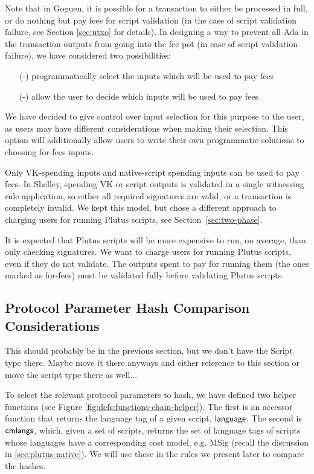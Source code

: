 Note that in Goguen, it is possible for a transaction
to either be processed in full, or do nothing but pay fees for script
validation (in the case of script validation failure, see Section
\ref{sec:utxo} for details).
In designing a way to prevent all Ada in the transaction outputs from going into
the fee pot (in case of script validation failure), we have considered two
possibilities:

\begin{itemize}
  \item[(-)] programmatically select the inputs which will be used to pay fees
  \item[(-)] allow the user to decide which inputs will be used to pay fees
\end{itemize}

We have decided to give control over input selection for this purpose to the user,
as users may have different considerations when making their selection. This
option will additionally allow users to write their own programmatic solutions
to choosing for-fees inputs.

Only VK-spending inputs and native-script spending inputs can
be used to pay fees. In Shelley, spending VK or script outputs is
validated in a single witnessing rule application, so either all
required signatures are valid, or a transaction is completely
invalid. We kept this model, but chose a different approach to
charging users for running Plutus scripts, see
Section~\ref{sec:two-phase}.

It is expected that Plutus scripts will be more expensive to run, on
average, than only checking signatures. We want to charge users for
running Plutus scripts, even if they do not validate. The outputs
spent to pay for running them (the ones marked as for-fees) must be
validated fully before validating Plutus scripts.

\subsection{Protocol Parameter Hash Comparison Considerations}

\begin{note}
  This should probably be in the previous section, but we don't have
  the Script type there. Maybe move it there anyways and either
  reference to this section or move the script type there as well...
\end{note}

To select the relevant protocol parameters to hash, we have defined two helper
functions (see Figure \ref{fig:defs:functions-chain-helper}). The first
is an accessor function that returns the language tag of a given script, $\mathsf{language}$.
The second is $\mathsf{cmlangs}$, which, given a set of scripts, returns the set
of language tags of scripts whose languages have a corresponding cost model,
e.g. MSig (recall the discussion in \ref{sec:plutus-native}).
We will use these in the rules we present later to compare the hashes.

